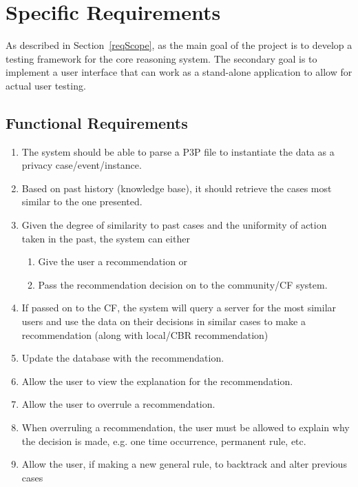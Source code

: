 \section{Specific Requirements}\label{specRec}

As described in Section~\ref{reqScope}, as the main goal of the project is to develop a testing framework for the core reasoning system. The secondary goal is to implement a user interface that can work as a stand-alone application to allow for actual user testing.

\subsection{Functional Requirements}\label{funcRequirements}
\begin{enumerate}
\item The system should be able to parse a P3P file to instantiate the data as a privacy case/event/instance.
\item Based on past history (knowledge base), it should retrieve the cases most similar to the one presented.
\item Given the degree of similarity to past cases and the uniformity of action taken in the past, the system can either 
  \begin{enumerate}
  \item Give the user a recommendation or 
  \item Pass the recommendation decision on to the community/CF system.
  \end{enumerate}
\item If passed on to the CF, the system will query a server for the most similar users and use the data on their decisions in similar cases to make a recommendation (along with local/CBR recommendation) 
\item Update the database with the recommendation.
\item Allow the user to view the explanation for the recommendation.
\item Allow the user to overrule a recommendation. 
\item When overruling a recommendation, the user must be allowed to explain why the decision is made, e.g. one time occurrence, permanent rule, etc.	
\item Allow the user, if making a new general rule, to backtrack and alter previous cases
\end{enumerate}

